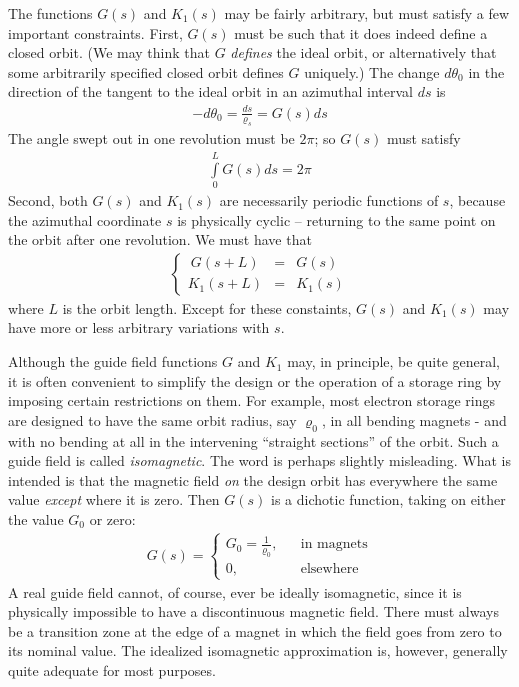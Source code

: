 The functions $G(s)$ and $K_1(s)$ may be fairly arbitrary, but must satisfy a few important constraints. First, $G(s)$ must be such that it does indeed define a closed orbit. (We may think that $G$ \textit{defines} the ideal orbit, or alternatively that some arbitrarily specified closed orbit defines $G$ uniquely.) The change $d\theta_0$ in the direction of the tangent to the ideal orbit in an azimuthal interval $ds$ is
\begin{align}
	-d\theta_0 = \frac{ds}{\varrho_s} = G(s)ds
\end{align}
The angle swept out in one revolution must be $2\pi$; so $G(s)$ must satisfy
\begin{align}
	\int\limits_{0}^{L} G(s)ds = 2\pi
\end{align}
Second, both $G(s)$ and $K_1(s)$ are necessarily periodic functions of $s$, because the azimuthal coordinate $s$ is physically cyclic -- returning to the same point on the orbit after one revolution. We must have that
\begin{align}
	\left\{\begin{array}{rcl}
	\ G(s+L) & = & G(s)\\
	K_1(s+L) & = & K_1(s)
	\end{array}\right.
\end{align}
where $L$ is the orbit length. Except for these constaints, $G(s)$ and $K_1(s)$ may have more or less arbitrary variations with $s$.

Although the guide field functions $G$ and $K_1$ may, in principle, be quite general, it is often convenient to simplify the design or the operation of a storage ring by imposing certain restrictions on them. For example, most electron storage rings are designed to have the same orbit radius, say $\varrho_0$, in all bending magnets - and with no bending at all in the intervening “straight sections” of the orbit. Such a guide field is called \textit{isomagnetic}. The word is perhaps slightly misleading. What is intended is that the magnetic field \textit{on} the design orbit has everywhere the same value \textit{except} where it is zero. Then $G(s)$ is a dichotic function, taking on either the value $G_0$ or zero:
\begin{align}\label{eq:2.9}
	G(s) = \left\{\begin{array}{rrrr}
	G_0 = \frac{1}{\varrho_0}, &&  \text{in magnets}\\
	0, && \text{elsewhere}
	\end{array}\right.
\end{align}
A real guide field cannot, of course, ever be ideally isomagnetic, since it is physically impossible to have a discontinuous magnetic field. There must always be a transition zone at the edge of a magnet in which the field goes from zero to its nominal value. The idealized isomagnetic approximation is, however, generally quite adequate for most purposes.

